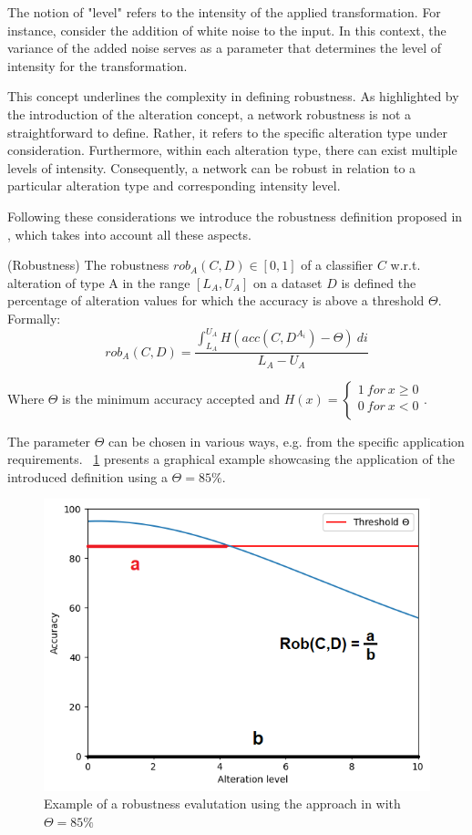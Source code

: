 The notion of "level" refers to the intensity of the applied transformation. For instance, consider the addition of white noise to the input. In this context, the variance of the added noise serves as a parameter that determines the level of intensity for the transformation.

This concept underlines the complexity in defining robustness. As highlighted by the introduction of the alteration concept, a network robustness is not a straightforward to define. Rather, it refers to the specific alteration type under consideration. Furthermore, within each alteration type, there can exist multiple levels of intensity. Consequently, a network can be robust in relation to a particular alteration type and corresponding intensity level.

Following these considerations we introduce the robustness definition proposed in \cite{9176802}, which takes into account all these aspects. 

\begin{definition} (Robustness)
	The robustness $rob_A(C,D) \in [0,1]$ of a classifier $C$ w.r.t. alteration of type A in the range $[L_A, U_A]$ on a dataset $D$ is defined the percentage of alteration values for which the accuracy is above a threshold $\Theta$. Formally:
	\[
		rob_A(C,D) = \frac{\int_{L_A}^{U_A} H(acc(C,D^{A_i}) - \Theta) \ di}{L_A - U_A}
	\]
	
	Where $\Theta$ is the minimum accuracy accepted and $ H(x) = \begin{cases}
		1 \ for \ x \geq 0\\
		0 \ for \ x < 0\\
	\end{cases}$.
\end{definition}

The parameter $\Theta$ can be chosen in various ways, e.g. from the specific application requirements. \Fig~\ref{fig:rob_example} presents a graphical example showcasing the application of the introduced definition using a $\Theta = 85\%$.

\begin{figure}[h]
	\centering
	\includegraphics[width=0.7\linewidth]{ImageFiles/ANNRob/rob_example}
	\caption{Example of a robustness evalutation using the approach in \cite{9176802} with $\Theta=85\%$}
	\label{fig:rob_example}
\end{figure}


